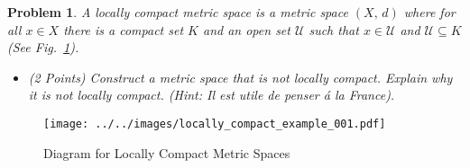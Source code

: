 \documentclass{article}
\theoremstyle{normal}
\newtheorem{problem}{Problem}
\begin{document}
    \begin{problem}
        A locally compact metric space is a metric space $(X,\,d)$ where for all
        $x\in{X}$ there is a compact set $K$ and an open set $\mathcal{U}$
        such that $x\in\mathcal{U}$ and $\mathcal{U}\subseteq{K}$
        (See Fig.~\ref{fig:locally_compact_metric_space_001}).
        \begin{itemize}
            \item (2 Points) Construct a metric space that is \textit{not}
                locally compact. Explain why it is not locally compact.
                (Hint: Il est utile de penser \'{a} la France).
        \end{itemize}
    \end{problem}
    \begin{figure}[H]
        \centering
        \texttt{[image: ../../images/locally\_compact\_example\_001.pdf]}
        \caption{Diagram for Locally Compact Metric Spaces}
        \label{fig:locally_compact_metric_space_001}
    \end{figure}
\end{document}
